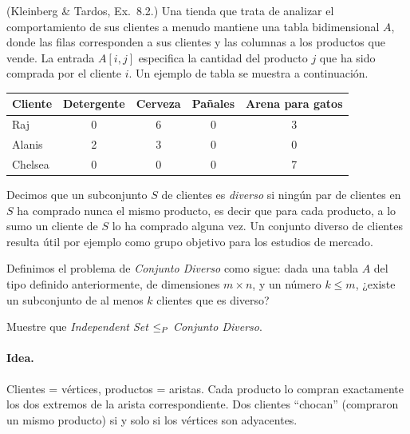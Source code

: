 \begin{enunciado}
(Kleinberg \& Tardos, Ex.~8.2.) Una tienda que trata de analizar el comportamiento de sus clientes a
menudo mantiene una tabla bidimensional $A$, donde las filas corresponden a sus clientes y las columnas
a los productos que vende. La entrada $A[i,j]$ especifica la cantidad del producto $j$ que ha sido comprada
por el cliente $i$. Un ejemplo de tabla se muestra a continuación.
\begin{center}
\begin{tabular}{lcccc}
\toprule
Cliente & Detergente & Cerveza & Pañales & Arena para gatos\\
\midrule
Raj & 0 & 6 & 0 & 3\\
Alanis & 2 & 3 & 0 & 0\\
Chelsea & 0 & 0 & 0 & 7\\
\bottomrule
\end{tabular}
\end{center}
Decimos que un subconjunto $S$ de clientes es \emph{diverso} si ningún par de clientes en $S$ ha comprado
nunca el mismo producto, es decir que para cada producto, a lo sumo un cliente de $S$ lo ha comprado
alguna vez. Un conjunto diverso de clientes resulta útil por ejemplo como grupo objetivo para los estudios
de mercado.

Definimos el problema de \emph{Conjunto Diverso} como sigue: dada una tabla $A$ del tipo definido
anteriormente, de dimensiones $m\times n$, y un número $k\le m$, ¿existe un subconjunto de al menos $k$
clientes que es diverso?

Muestre que \emph{Independent Set} $\le_P$ \emph{Conjunto Diverso}.
\end{enunciado}


\paragraph{Idea.} Clientes = vértices, productos = aristas. Cada producto lo compran exactamente los
dos extremos de la arista correspondiente. Dos clientes ``chocan'' (compraron un mismo producto) si y solo si
los vértices son adyacentes.

